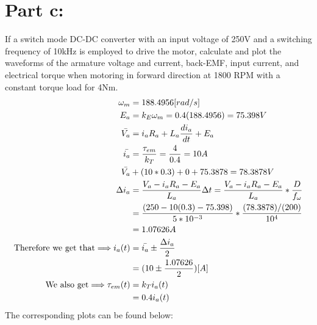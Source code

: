 \documentclass{article}
\begin{document}
\section*{Part c:}
If a switch mode DC-DC converter with an input voltage of 250V and a switching frequency of 10kHz is employed to drive the motor, calculate and plot the waveforms of the armature voltage and current, back-EMF, input current, and electrical torque when motoring in forward direction at 1800 RPM with a constant torque load for 4Nm.
\begin{align*}
    \omega_m &= 188.4956 [rad/s]\\
    E_a &= k_E \omega_m = 0.4 (188.4956) = 75.398V\\
    \Bar{V_a} &= i_a R_a + L_a \frac{di_a}{dt} + E_a\\
    \Bar{i_a} &= \frac{\tau_{em}}{k_T} = \frac{4}{0.4} = 10A\\
    \Bar{V_a} &+ (10*0.3)+ 0 + 75.3878 = 78.3878 V\\
    \Delta i_a &= \frac{V_a - i_a R_a - E_a}{L_a} \Delta t = \frac{V_a - i_a R_a - E_a}{L_a}* \frac{D}{f_\omega}\\
    &= \frac{(250 - 10(0.3) - 75.398)}{5*10^{-3}}*\frac{(78.3878)/(200)}{10^4}\\
    &= 1.07626A \\
    \mbox{Therefore we get that} \Longrightarrow i_a(t) &= \Bar{i_a} \pm \frac{\Delta i_a}{2}\\
    &= (10 \pm \frac{1.07626}{2})[A]\\
    \mbox{We also get} \Longrightarrow \tau_{em}(t) &= k_T i_a(t)\\
    &= 0.4 i_a(t)\\
\end{align*}
The corresponding plots can be found below:
\begin{center}
\end{center}
\begin{center}
\end{center}
\end{document}
